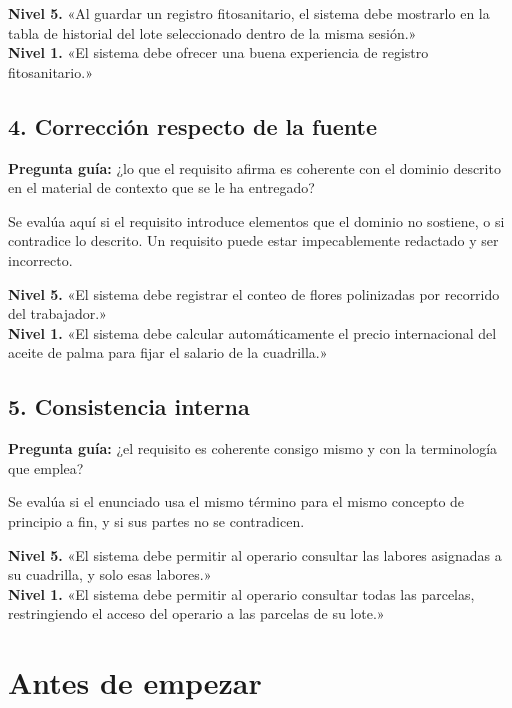 \documentclass[11pt,a4paper]{article}
\newcommand{\dimtitulo}[1]{\subsection*{\color{uteqverde}#1}}
\begin{document}
\begin{tcolorbox}[colback=white,colframe=uteqverde!45,boxrule=0.5pt,arc=2pt]
\textbf{Nivel 5.} «Al guardar un registro fitosanitario, el sistema debe
mostrarlo en la tabla de historial del lote seleccionado dentro de la misma
sesión.»\\[4pt]
\textbf{Nivel 1.} «El sistema debe ofrecer una buena experiencia de registro
fitosanitario.»
\end{tcolorbox}

\dimtitulo{4. Corrección respecto de la fuente}

\textbf{Pregunta guía:} ¿lo que el requisito afirma es coherente con el dominio
descrito en el material de contexto que se le ha entregado?

Se evalúa aquí si el requisito introduce elementos que el dominio no sostiene,
o si contradice lo descrito. Un requisito puede estar impecablemente redactado
y ser incorrecto.

\begin{tcolorbox}[colback=white,colframe=uteqverde!45,boxrule=0.5pt,arc=2pt]
\textbf{Nivel 5.} «El sistema debe registrar el conteo de flores polinizadas
por recorrido del trabajador.»\\[4pt]
\textbf{Nivel 1.} «El sistema debe calcular automáticamente el precio
internacional del aceite de palma para fijar el salario de la cuadrilla.»
\end{tcolorbox}

\dimtitulo{5. Consistencia interna}

\textbf{Pregunta guía:} ¿el requisito es coherente consigo mismo y con la
terminología que emplea?

Se evalúa si el enunciado usa el mismo término para el mismo concepto de
principio a fin, y si sus partes no se contradicen.

\begin{tcolorbox}[colback=white,colframe=uteqverde!45,boxrule=0.5pt,arc=2pt]
\textbf{Nivel 5.} «El sistema debe permitir al operario consultar las labores
asignadas a su cuadrilla, y solo esas labores.»\\[4pt]
\textbf{Nivel 1.} «El sistema debe permitir al operario consultar todas las
parcelas, restringiendo el acceso del operario a las parcelas de su lote.»
\end{tcolorbox}

\section{Antes de empezar}
\end{document}
